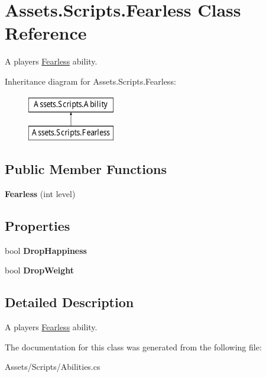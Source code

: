 \hypertarget{class_assets_1_1_scripts_1_1_fearless}{}\section{Assets.\+Scripts.\+Fearless Class Reference}
\label{class_assets_1_1_scripts_1_1_fearless}


A player\textquotesingle{}s \hyperlink{class_assets_1_1_scripts_1_1_fearless}{Fearless} ability.  


Inheritance diagram for Assets.\+Scripts.\+Fearless\+:\begin{figure}[H]
\begin{center}
\leavevmode
\includegraphics[height=2.000000cm]{class_assets_1_1_scripts_1_1_fearless}
\end{center}
\end{figure}
\subsection*{Public Member Functions}
\begin{DoxyCompactItemize}
\item 
{\bfseries Fearless} (int level)\hypertarget{class_assets_1_1_scripts_1_1_fearless_a80e98e804d4be8501dab18a466294687}{}\label{class_assets_1_1_scripts_1_1_fearless_a80e98e804d4be8501dab18a466294687}

\end{DoxyCompactItemize}
\subsection*{Properties}
\begin{DoxyCompactItemize}
\item 
bool {\bfseries Drop\+Happiness}\hypertarget{class_assets_1_1_scripts_1_1_fearless_adf5b9c746098169ec53dd02dedaded6a}{}\label{class_assets_1_1_scripts_1_1_fearless_adf5b9c746098169ec53dd02dedaded6a}

\item 
bool {\bfseries Drop\+Weight}\hypertarget{class_assets_1_1_scripts_1_1_fearless_a8086affa2c56d194473377eabf666733}{}\label{class_assets_1_1_scripts_1_1_fearless_a8086affa2c56d194473377eabf666733}

\end{DoxyCompactItemize}


\subsection{Detailed Description}
A player\textquotesingle{}s \hyperlink{class_assets_1_1_scripts_1_1_fearless}{Fearless} ability. 



The documentation for this class was generated from the following file\+:\begin{DoxyCompactItemize}
\item 
Assets/\+Scripts/Abilities.\+cs\end{DoxyCompactItemize}
